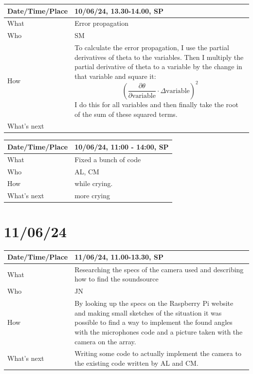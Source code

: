 \documentclass{article}
\begin{document}
\begin{table}[H]
\begin{tabular}{|p{1.5in}|p{4in}|}
\hline
Date/Time/Place &  10/06/24, 13.30-14.00, SP\\ \hline
What            &  Error propagation\\ \hline
Who             &  SM\\ \hline
How             &   To calculate the error propagation, I use the partial derivatives of theta to the variables. Then I multiply the partial derivative of theta to a variable by the change in that variable and square it: $$(\frac{\partial\theta}{\partial \text{variable}}\cdot\Delta\text{variable})^2$$ I do this for all variables and then finally take the root of the sum of these squared terms.\\ \hline
What's next     &  \\ \hline
\end{tabular}
\end{table}

\begin{table}[H]
\begin{tabular}{|p{1.5in}|p{4in}|}
\hline
Date/Time/Place &  10/06/24, 11:00 - 14:00, SP\\ \hline
What            &  Fixed a bunch of code\\ \hline
Who             &  AL, CM\\ \hline
How             &  while crying.\\ \hline
What's next     &  more crying\\ \hline
\end{tabular}
\end{table}

\section{11/06/24}

\begin{table}[H]
\begin{tabular}{|p{1.5in}|p{4in}|}
\hline
Date/Time/Place &  11/06/24, 11.00-13.30, SP\\ \hline
What            &  Researching the specs of the camera used and describing how to find the soundsource\\ \hline
Who             &  JN\\ \hline
How             &  By looking up the specs on the Raspberry Pi website and making small sketches of the situation it was possible to find a way to implement the found angles with the microphones code and a picture taken with the camera on the array. \\ \hline
What's next     &  Writing some code to actually implement the camera to the existing code written by AL and CM.\\ \hline
\end{tabular}
\end{table}
\end{document}
